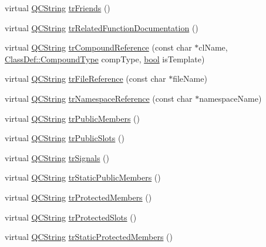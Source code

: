 \begin{DoxyCompactItemize}
virtual \hyperlink{class_q_c_string}{Q\+C\+String} \hyperlink{class_translator_arabic_a7e545f1ee3203efb6d593ef4134614e5}{tr\+Friends} ()
\item 
virtual \hyperlink{class_q_c_string}{Q\+C\+String} \hyperlink{class_translator_arabic_a0f490a6c4b322b59e8d6c22b1a434b36}{tr\+Related\+Function\+Documentation} ()
\item 
virtual \hyperlink{class_q_c_string}{Q\+C\+String} \hyperlink{class_translator_arabic_a85e631bcd4aa1799bbf8d45c7ccdda00}{tr\+Compound\+Reference} (const char $\ast$cl\+Name, \hyperlink{class_class_def_ae70cf86d35fe954a94c566fbcfc87939}{Class\+Def\+::\+Compound\+Type} comp\+Type, \hyperlink{qglobal_8h_a1062901a7428fdd9c7f180f5e01ea056}{bool} is\+Template)
\item 
virtual \hyperlink{class_q_c_string}{Q\+C\+String} \hyperlink{class_translator_arabic_aa2eb3e4f87da52248ea4f8f02999c902}{tr\+File\+Reference} (const char $\ast$file\+Name)
\item 
virtual \hyperlink{class_q_c_string}{Q\+C\+String} \hyperlink{class_translator_arabic_ab1685de25aa975dd9481494a1fd5dc86}{tr\+Namespace\+Reference} (const char $\ast$namespace\+Name)
\item 
virtual \hyperlink{class_q_c_string}{Q\+C\+String} \hyperlink{class_translator_arabic_a11f34bd8deb46e3f063f85b7da809a12}{tr\+Public\+Members} ()
\item 
virtual \hyperlink{class_q_c_string}{Q\+C\+String} \hyperlink{class_translator_arabic_a60ffdc6e5136a04b0419f345ae07a24c}{tr\+Public\+Slots} ()
\item 
virtual \hyperlink{class_q_c_string}{Q\+C\+String} \hyperlink{class_translator_arabic_a1462112ac2dd2187f89747102c64d7e4}{tr\+Signals} ()
\item 
virtual \hyperlink{class_q_c_string}{Q\+C\+String} \hyperlink{class_translator_arabic_a2b780efc27a29346708a7e09db5f91de}{tr\+Static\+Public\+Members} ()
\item 
virtual \hyperlink{class_q_c_string}{Q\+C\+String} \hyperlink{class_translator_arabic_ab8712584fb25c39ce8c476aedfc0adbd}{tr\+Protected\+Members} ()
\item 
virtual \hyperlink{class_q_c_string}{Q\+C\+String} \hyperlink{class_translator_arabic_a93207e94befef764a2152e7b5968bcd1}{tr\+Protected\+Slots} ()
\item 
virtual \hyperlink{class_q_c_string}{Q\+C\+String} \hyperlink{class_translator_arabic_adcd035f442320c1ac2bc2252ee5af778}{tr\+Static\+Protected\+Members} ()
\item 

\end{DoxyCompactItemize}

